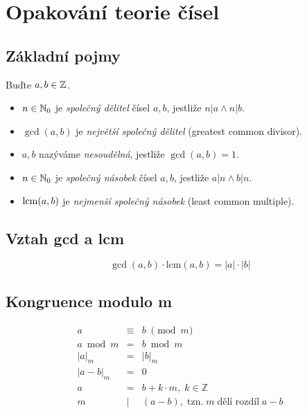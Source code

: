 \section{Opakování teorie čísel}

\subsection{Základní pojmy}

Buďte $a,b \in \mathbb{Z}$.

\begin{itemize}
    \item $n \in \mathbb{N}_0$ je \emph{společný dělitel} čísel $a, b$, jestliže $n|a \wedge n|b$.
    \item $\gcd(a,b)$ je \emph{největší společný dělitel} (greatest common divisor).
    \item $a,b$ nazýváme \emph{nesoudělná}, jestliže $\gcd(a,b)=1$.
    \item $n \in \mathbb{N}_0$ je \emph{společný násobek} čísel $a, b$, jestliže $a|n \wedge b|n$.
    \item $\operatorname{lcm}(a,b)$ je \emph{nejmenší společný násobek} (least common multiple).
\end{itemize}

\subsection{Vztah gcd a lcm}

\[
    \gcd(a, b) \cdot \text{lcm}(a, b) = |a| \cdot |b|
\]

\subsection{Kongruence modulo m}

\[
    \begin{array}{rcl}
        a         & \equiv & b \; \pmod m                                                \\
        a \bmod m & =      & b \bmod m                                                   \\
        |a|_m     & =      & |b|_m                                                       \\
        |a - b|_m & =      & 0                                                           \\
        a         & =      & b + k \cdot m, \; k \in \mathbb{Z}                          \\
        m         & \mid   & (a - b), \; \text{tzn.} \; m \; \text{dělí rozdíl} \; a - b \\
    \end{array}
\]

